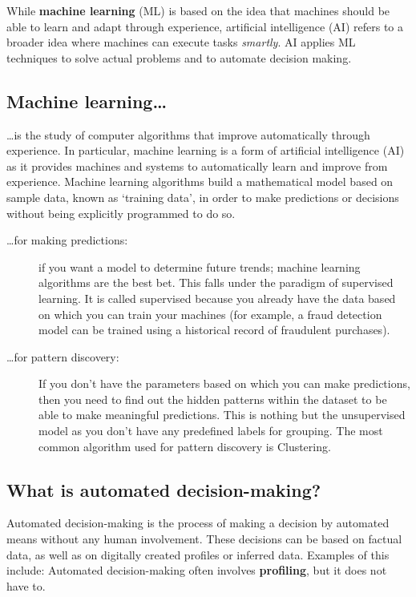 While \textbf{machine learning} (ML) is based on the idea that machines should be able to learn and adapt through experience, artificial intelligence (AI) refers to a broader idea where machines can execute tasks \textit{smartly}. AI applies ML techniques to solve actual problems and to automate decision making.


\subsection{Machine learning\dots}
\dots  is the study of computer algorithms that improve automatically through experience. In particular,  machine learning is a form of artificial intelligence (AI) as it provides machines and systems to automatically learn and improve from experience. Machine learning algorithms build a mathematical model based on sample data, known as `training data', in order to make predictions or decisions without being explicitly programmed to do so.
\begin{description}
	\item[\dots  for making predictions:] if you want a model to determine future
	trends; machine learning algorithms are the best bet. This falls under the paradigm of
	supervised learning. It is called supervised because you already have the data based on
	which you can train your machines (for example, a fraud detection model can be
	trained using a historical record of fraudulent purchases).\\
	
	\item[\dots for pattern discovery:] If you don’t have the parameters based on which you can make
	predictions, then you need to find out the hidden patterns within the dataset to be
	able to make meaningful predictions. This is nothing but the unsupervised model as
	you don’t have any predefined labels for grouping. The most common algorithm used
	for pattern discovery is Clustering.
\end{description}


\pbn

\subsection{What is automated decision-making?}
Automated decision-making is the process of making a decision by automated means without any human involvement. These decisions can be based on factual data, as well as on digitally created profiles or inferred data. Examples of this include:	
Automated decision-making often involves \textbf{profiling}, but it does not have to.

